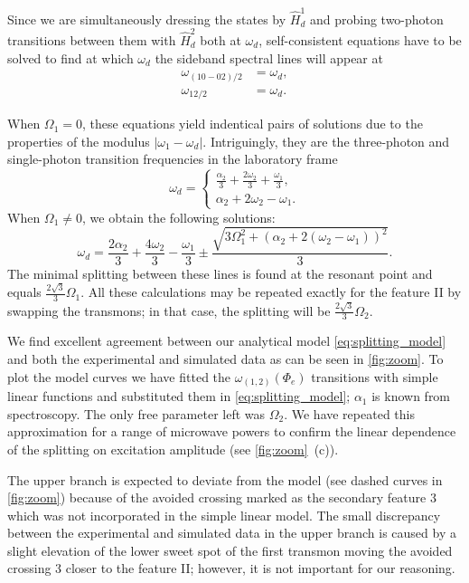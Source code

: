 \documentclass[%
 prx,
 amsmath,amssymb,
 reprint,%
]{revtex4-1}
\begin{document}
Since we are simultaneously dressing the states by $\hat H_d^1$ and probing two-photon transitions between them with $\hat H_d^2$ both at $\omega_d$, self-consistent equations have to be solved to find at which $\omega_d$ the sideband spectral lines will appear at
\begin{equation}
\begin{aligned}
\omega_{(10-02)/2} &= \omega_d,\\
\omega_{12/2} &= \omega_d.
\end{aligned}
\label{eq:two-photon}
\end{equation}

When $\Omega_1 = 0$, these equations yield indentical pairs of solutions due to the properties of the modulus $|\omega_1 - \omega_d|$. Intriguingly, they are the three-photon and single-photon transition frequencies in the laboratory frame
\begin{equation}
\omega_d = \begin{cases} \frac{\alpha_2}{3} + \frac{2 \omega_{2}}{3} + \frac{\omega_{1}}{3}, \\ \alpha_2 + 2 \omega_{2} - \omega_{1}.\end{cases}
\end{equation}
When $\Omega_1 \neq 0$, we obtain the following solutions:
\begin{equation}
\omega_d = \frac{2 \alpha_2}{3} + \frac{4 \omega_{2}}{3} - \frac{\omega_{1}}{3} \pm \frac{\sqrt{3 \Omega_{1}^{2} + \left( \alpha_2 + 2 (\omega_{2} - \omega_{1})\right)^{2}}}{3}.
\label{eq:splitting_model}
\end{equation}
The minimal splitting between these lines is found at the resonant point and equals $\frac{2 \sqrt{3}}{{3}} \Omega_1$. All these calculations may be repeated exactly for the feature II by swapping the transmons; in that case, the splitting will be $\frac{2 \sqrt{3}}{{3}} \Omega_2$.

We find excellent agreement between our analytical model \autoref{eq:splitting_model} and both the experimental and simulated data as can be seen in \autoref{fig:zoom}. To plot the model curves we have fitted the $\omega_{(1,2)}(\Phi_e)$ transitions with simple linear functions and substituted them in \autoref{eq:splitting_model}; $\alpha_1$ is known from spectroscopy. The only free parameter left was $\Omega_2$. We have repeated this approximation for a range of microwave powers to confirm the linear dependence of the splitting on excitation amplitude (see \autoref{fig:zoom}~(c)).

The upper branch is expected to deviate from the model (see dashed curves in \autoref{fig:zoom}) because of the avoided crossing marked as the secondary feature 3 which was not incorporated in the simple linear model. The small discrepancy between the experimental and simulated data in the upper branch is caused by a slight elevation of the lower sweet spot of the first transmon moving the avoided crossing 3 closer to the feature II; however, it is not important for our reasoning.	
\end{document}
